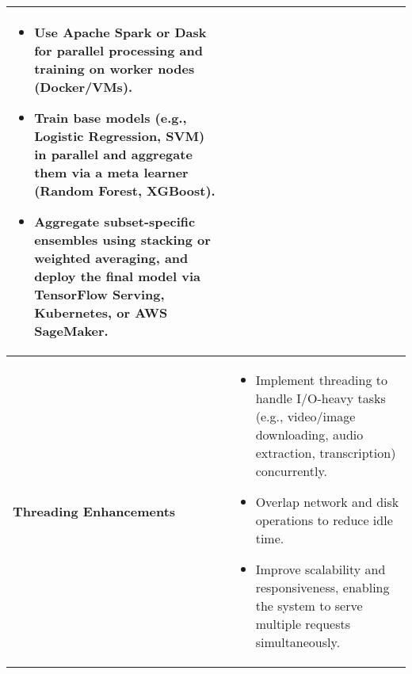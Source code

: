 \begin{table}[H]
\begin{tabularx}{\textwidth}{|>{\raggedright\arraybackslash}p{3cm}|X|}
\begin{itemize}[noitemsep, leftmargin=*, topsep=0pt]
        \item Use Apache Spark or Dask for parallel processing and training on worker nodes (Docker/VMs).
        \item Train base models (e.g., Logistic Regression, SVM) in parallel and aggregate them via a meta learner (Random Forest, XGBoost).
        \item Aggregate subset-specific ensembles using stacking or weighted averaging, and deploy the final model via TensorFlow Serving, Kubernetes, or AWS SageMaker.
    \end{itemize} \\ \hline
    \textbf{Threading Enhancements} & 
    \begin{itemize}[noitemsep, leftmargin=*, topsep=0pt]
        \item Implement threading to handle I/O-heavy tasks (e.g., video/image downloading, audio extraction, transcription) concurrently.
        \item Overlap network and disk operations to reduce idle time.
        \item Improve scalability and responsiveness, enabling the system to serve multiple requests simultaneously.
    \end{itemize} \\ \hline
    \end{tabularx}
\end{table}


\pagebreak
